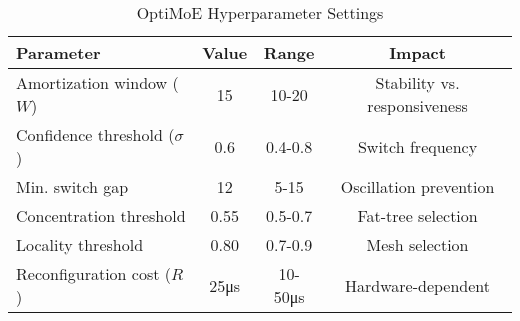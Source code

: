 \begin{table}[h]
\centering
\caption{OptiMoE Hyperparameter Settings}
\label{tab:hyperparameters}
\begin{tabular}{lccc}
\toprule
\textbf{Parameter} & \textbf{Value} & \textbf{Range} & \textbf{Impact} \\
\midrule
Amortization window ($W$) & 15 & 10-20 & Stability vs. responsiveness \\
Confidence threshold ($\sigma$) & 0.6 & 0.4-0.8 & Switch frequency \\
Min. switch gap & 12 & 5-15 & Oscillation prevention \\
Concentration threshold & 0.55 & 0.5-0.7 & Fat-tree selection \\
Locality threshold & 0.80 & 0.7-0.9 & Mesh selection \\
Reconfiguration cost ($R$) & 25μs & 10-50μs & Hardware-dependent \\
\bottomrule
\end{tabular}
\end{table}

